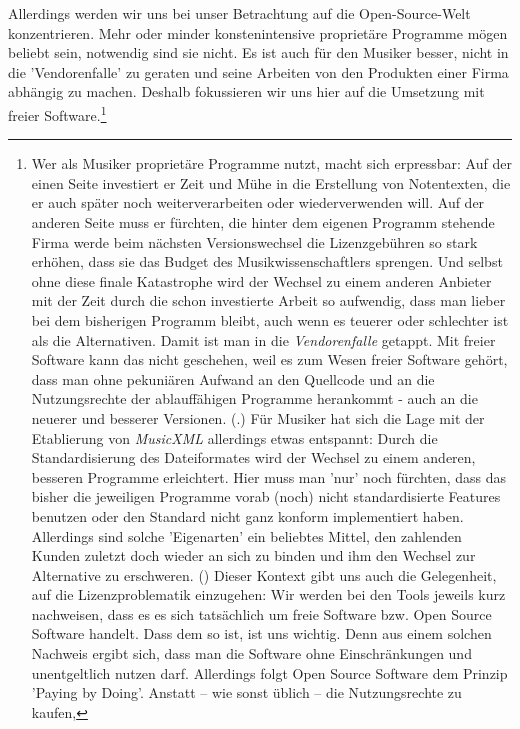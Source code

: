 Allerdings werden wir uns bei unser Betrachtung auf die Open-Source-Welt
konzentrieren. Mehr oder minder konstenintensive proprietäre Programme mögen
beliebt sein, notwendig sind sie nicht. Es ist auch für den Musiker besser,
nicht in die 'Vendorenfalle' zu geraten und seine Arbeiten von den Produkten
einer Firma abhängig zu machen. Deshalb fokussieren wir uns hier auf die
Umsetzung mit freier Software.\footnote{Wer als Musiker proprietäre Programme
nutzt, macht sich erpressbar: Auf der einen Seite investiert er Zeit und Mühe in
die Erstellung von Notentexten, die er auch später noch weiterverarbeiten oder
wiederverwenden will. Auf der anderen Seite muss er fürchten, die hinter dem
eigenen Programm stehende Firma werde beim nächsten Versionswechsel die
Lizenzgebühren so stark erhöhen, dass sie das Budget des Musikwissenschaftlers
sprengen. Und selbst ohne diese finale Katastrophe wird der Wechsel zu einem
anderen Anbieter mit der Zeit durch die schon investierte Arbeit so aufwendig,
dass man lieber bei dem bisherigen Programm bleibt, auch wenn es teuerer oder
schlechter ist als die Alternativen. Damit ist man in die \textit{Vendorenfalle}
getappt. Mit freier Software kann das nicht geschehen, weil es zum Wesen freier
Software gehört, dass man ohne pekuniären Aufwand an den Quellcode und an die
Nutzungsrechte der ablauffähigen Programme herankommt - auch an die neuerer und
besserer Versionen. (\cite[vgl. dazu][\nopage wp.]{FSF2018a}.) Für Musiker hat
sich die Lage mit der Etablierung von \textit{MusicXML} allerdings etwas
entspannt: Durch die Standardisierung des Dateiformates wird der Wechsel zu
einem anderen, besseren Programme erleichtert. Hier muss man 'nur' noch
fürchten, dass das bisher die jeweiligen Programme vorab (noch) nicht
standardisierte Features benutzen oder den Standard nicht ganz konform
implementiert haben. Allerdings sind solche 'Eigenarten' ein beliebtes Mittel,
den zahlenden Kunden zuletzt doch wieder an sich zu binden und ihm den Wechsel
zur Alternative zu erschweren. (\cite[Zur Lizenzierung von MusicXML vgl.
auch][\nopage wp.]{WpedMusicXML2018a}) Dieser Kontext gibt uns auch die
Gelegenheit, auf die Lizenzproblematik einzugehen: Wir werden bei den Tools
jeweils kurz nachweisen, dass es es sich tatsächlich um freie Software bzw. Open
Source Software handelt. Dass dem so ist, ist uns wichtig. Denn aus einem
solchen Nachweis ergibt sich, dass man die Software ohne Einschränkungen und
unentgeltlich nutzen darf. Allerdings folgt Open Source Software dem Prinzip
'Paying by Doing'. Anstatt -- wie sonst üblich -- die Nutzungsrechte zu kaufen,
}
